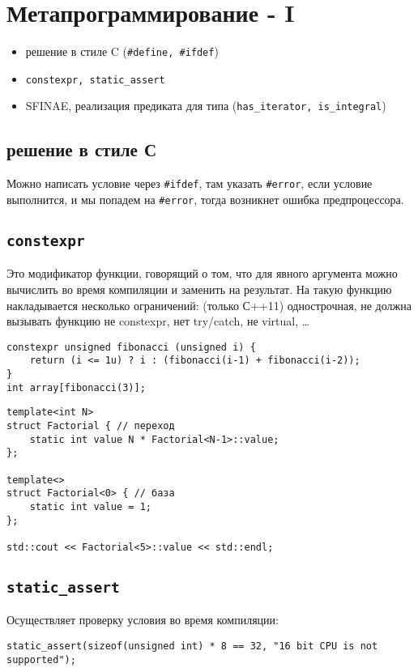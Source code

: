 \section{Метапрограммирование - I}
\begin{itemize}[noitemsep]
	\item решение в стиле C (\texttt{\#define, \#ifdef})
	\item \texttt{constexpr, static\_assert}
	\item SFINAE, реализация предиката для типа (\texttt{has\_iterator, is\_integral})
\end{itemize}
\subsection{решение в стиле С}
Можно написать условие через \texttt{\#ifdef}, там указать \texttt{\#error}, если условие выполнится, и мы попадем на \texttt{\#error}, тогда возникнет ошибка предпроцессора.

\subsection{\texttt{constexpr}}
Это модификатор функции, говорящий о том, что для явного аргумента можно вычислить во время компиляции и заменить на результат. На такую функцию накладывается несколько ограничений: (только С++11) однострочная, не должна вызывать функцию не constexpr, нет try/catch, не virtual, \ldots 
\begin{verbatim}
constexpr unsigned fibonacci (unsigned i) {
	return (i <= 1u) ? i : (fibonacci(i-1) + fibonacci(i-2));
}
int array[fibonacci(3)];
\end{verbatim}
\begin{verbatim}
template<int N>
struct Factorial { // переход 
    static int value N * Factorial<N-1>::value;
};

template<>
struct Factorial<0> { // база 
    static int value = 1;
};

std::cout << Factorial<5>::value << std::endl;
\end{verbatim}

\subsection{\texttt{static\_assert}}
Осуществляет проверку условия во время компиляции:
\begin{verbatim}
static_assert(sizeof(unsigned int) * 8 == 32, "16 bit CPU is not supported");
\end{verbatim}

